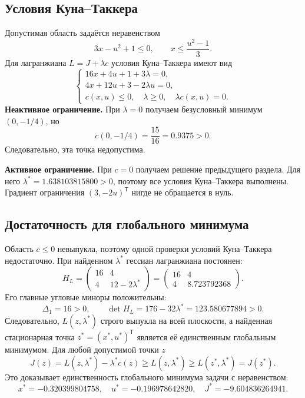 \documentclass[12pt,a4paper]{article}
\begin{document}
\subsection{Условия Куна--Таккера}
Допустимая область задаётся неравенством
\[
3x-u^2+1\leq0,\qquad x\leq\frac{u^2-1}{3}.
\]
Для лагранжиана $L=J+\lambda c$ условия Куна--Таккера имеют вид
\begin{equation}
\begin{cases}
16x+4u+1+3\lambda=0,\\
4x+12u+3-2\lambda u=0,\\
c(x,u)\leq0,\quad \lambda\geq0,\quad \lambda c(x,u)=0.
\end{cases}
\end{equation}
\textbf{Неактивное ограничение.}
При $\lambda=0$ получаем безусловный минимум $(0,-1/4)$, но
\[
c(0,-1/4)=\frac{15}{16}=0.9375>0.
\]
Следовательно, эта точка недопустима.

\textbf{Активное ограничение.}
При $c=0$ получаем решение предыдущего раздела. Для него
$\lambda^*=1.638103815800>0$, поэтому все условия Куна--Таккера выполнены.
Градиент ограничения $(3,-2u)^{\mathsf T}$ нигде не обращается в нуль.

\subsection{Достаточность для глобального минимума}
Область $c\leq0$ невыпукла, поэтому одной проверки условий
Куна--Таккера недостаточно. При найденном $\lambda^*$ гессиан
лагранжиана постоянен:
\[
H_L=\begin{pmatrix}16&4\\4&12-2\lambda^*\end{pmatrix}
=\begin{pmatrix}16&4\\4&8.723792368\end{pmatrix}.
\]
Его главные угловые миноры положительны:
\[
\Delta_1=16>0,\qquad
\det H_L=176-32\lambda^*=123.580677894>0.
\]
Следовательно, $L(z,\lambda^*)$ строго выпукла на всей плоскости,
а найденная стационарная точка $z^*=(x^*,u^*)^{\mathsf T}$ является
её единственным глобальным минимумом. Для любой допустимой точки $z$
\[
J(z)=L(z,\lambda^*)-\lambda^*c(z)
\geq L(z,\lambda^*)\geq L(z^*,\lambda^*)=J(z^*).
\]
Это доказывает единственность глобального минимума задачи с неравенством:
\[
x^*=-0.320399804758,\quad u^*=-0.196978642820,\quad
J^*=-9.604836264941.
\]
\newpage
\end{document}
